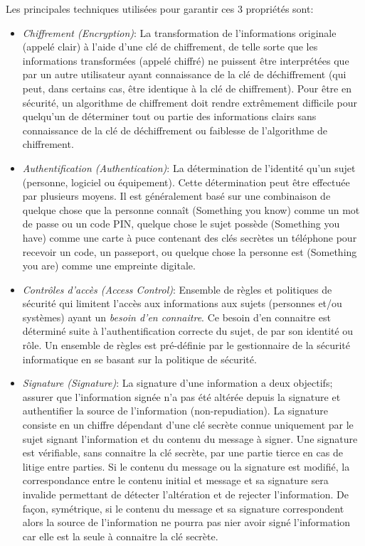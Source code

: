 Les principales techniques utilis\'ees pour garantir ces 3 propri\'et\'es sont:
\begin{itemize}
\setlength\itemsep{1em}
\item \emph{Chiffrement (Encryption)}: La transformation de l'informations originale (appel\'e clair) \`a l'aide d'une cl\'e de chiffrement, de telle sorte que les informations transform\'ees (appel\'e chiffr\'e) ne puissent \^etre interpr\'et\'ees que par un autre utilisateur ayant connaissance de la cl\'e de d\'echiffrement (qui peut, dans certains cas, \^etre identique \`a la cl\'e de chiffrement). Pour \^etre en s\'ecurit\'e, un algorithme de chiffrement doit rendre extr\^emement difficile pour quelqu'un de d\'eterminer tout ou partie des informations clairs sans connaissance de la cl\'e de d\'echiffrement ou faiblesse de l'algorithme de chiffrement. 

\item \emph{Authentification (Authentication)}: La d\'etermination de l'identit\'e qu'un sujet (personne, logiciel ou \'equipement). Cette d\'etermination peut \^etre effectu\'ee par plusieurs moyens. Il est g\'en\'eralement bas\'e sur une combinaison de quelque chose que la personne conna\^it (Something you know) comme un mot de passe ou un code PIN, quelque chose le sujet poss\`ede (Something you have) comme une carte \`a puce contenant des cl\'es secr\`etes un t\'el\'ephone pour recevoir un code, un passeport, ou quelque chose la personne est (Something you are) comme une empreinte digitale.

\item \emph{Contr\^oles d'acc\`es (Access Control)}: Ensemble de r\`egles et politiques de s\'ecurit\'e qui limitent l'acc\`es aux informations aux sujets (personnes et/ou syst\`emes) ayant un \emph{besoin d'en connaitre}. Ce besoin d'en connaitre est d\'etermin\'e suite \`a l'authentification correcte du sujet, de par son identit\'e ou r\^ole. Un ensemble de r\`egles est pr\'e-d\'efinie par le gestionnaire de la s\'ecurit\'e informatique en se basant sur la politique de s\'ecurit\'e.

\item \emph{Signature (Signature)}: La signature d'une information a deux objectifs; assurer que l'information sign\'ee n'a pas \'et\'e alt\'er\'ee depuis la signature et authentifier la source de l'information (non-repudiation). La signature consiste en un chiffre d\'ependant d'une cl\'e secr\`ete connue uniquement par le sujet signant l'information et du contenu du message \`a signer. Une signature est v\'erifiable, sans connaitre la cl\'e secr\`ete, par une partie tierce en cas de litige entre parties. Si le contenu du message ou la signature est modifi\'e, la correspondance entre le contenu initial et message et sa signature sera invalide permettant de d\'etecter l'alt\'eration et de rejecter l'information. De fa\c con, sym\'etrique, si le contenu du message et sa signature correspondent alors la source de l'information ne pourra pas nier avoir sign\'e l'information car elle est la seule \`a connaitre la cl\'e secr\`ete.


\end{itemize}
